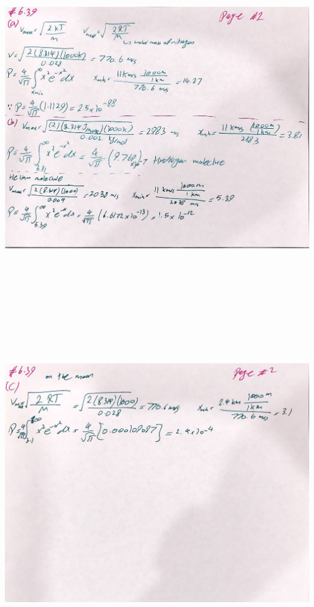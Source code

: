 \documentclass[fleqn]{article}
\begin{document}
\begin{enumerate}
      \begin{center}
        \includegraphics[height=15cm, width=16cm]{639A.JPG}
      \end{center}
      \pagebreak
      \begin{center}
        \includegraphics[height=15cm, width=16cm]{639B.JPG}
      \end{center}


\end{enumerate}
\end{document}
